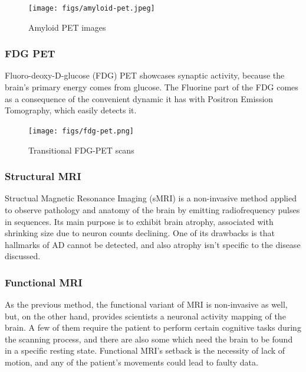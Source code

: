 \documentclass[a4paper, 12pt]{article}
\begin{document}
\begin{figure}[htbp]
    \centering
    \texttt{[image: figs/amyloid-pet.jpeg]}
    \caption{Amyloid PET images}
    \label{fig:amyloid-pet}
\end{figure}

\subsubsection*{FDG PET}
Fluoro-deoxy-D-glucose (FDG) PET showcases synaptic activity, because the brain's primary energy comes from glucose.
The Fluorine part of the FDG comes as a consequence of the convenient dynamic it has with Positron Emission Tomography,
which easily detects it.

\begin{figure}[htbp]
    \centering
    \texttt{[image: figs/fdg-pet.png]}
    \caption{Transitional FDG-PET scans}
    \label{fig:fdg-pet}
\end{figure}

\subsubsection*{Structural MRI}
Structual Magnetic Resonance Imaging (sMRI) is a non-invasive method applied to observe pathology and anatomy of the brain
by emitting radiofrequency pulses in sequences. Its main purpose is to exhibit brain atrophy, associated with shrinking size
due to neuron counts declining. One of its drawbacks is that hallmarks of AD cannot be detected, and also atrophy isn't
specific to the disease discussed.

\subsubsection*{Functional MRI}
As the previous method, the functional variant of MRI is non-invasive as well, but, on the other hand, provides
scientists a neuronal activity mapping of the brain. A few of them require the patient to perform certain cognitive tasks
during the scanning process, and there are also some which need the brain to be found in a specific resting state.
Functional MRI's setback is the necessity of lack of motion, and any of the patient's movements could lead to faulty
data.


\newpage




\end{document}
